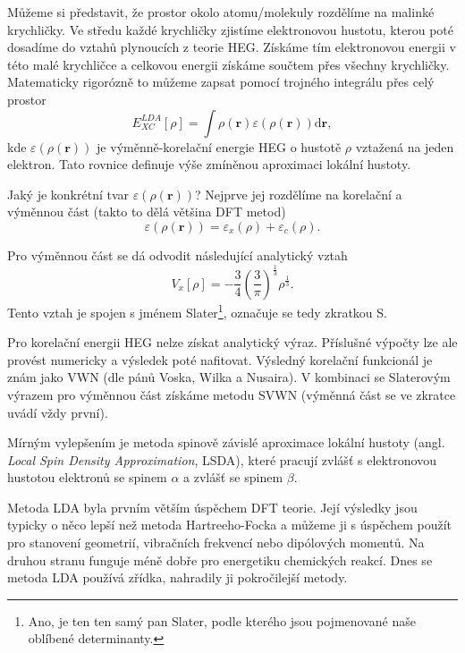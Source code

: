 Můžeme si představit, že prostor okolo atomu/molekuly rozdělíme na malinké krychličky. Ve středu každé krychličky zjistíme elektronovou hustotu, kterou poté dosadíme do vztahů plynoucích z teorie HEG.
Získáme tím elektronovou energii v této malé krychličce a celkovou energii získáme součtem přes všechny krychličky. Matematicky rigorózně to můžeme zapsat pomocí trojného integrálu přes celý prostor
\begin{equation}
E_{XC}^{LDA}[\rho]=\int \rho(\textbf{r}) \varepsilon(\rho(\textbf{r})) \mathrm{d}\textbf{r} ,
\end{equation}
kde $\varepsilon(\rho(\textbf{r}))$ je výměnně-korelační energie HEG o hustotě $\rho$ vztažená na jeden elektron. Tato rovnice definuje výše zmíněnou aproximaci lokální hustoty.

Jaký je konkrétní tvar $\varepsilon(\rho(\textbf{r}))$? Nejprve jej rozdělíme na korelační a výměnnou část (takto to dělá většina DFT metod)
\begin{equation}
\varepsilon(\rho(\textbf{r}))=\varepsilon_x(\rho)+\varepsilon_c(\rho) .
\end{equation}

\noindent Pro výměnnou část se dá odvodit následující analytický vztah
\begin{equation}
V_x[\rho]=-\frac{3}{4}\left(\frac{3}{\pi}\right)^{\frac{1}{3}}\rho^{\frac{1}{3}}.
\end{equation}
Tento vztah je spojen s jménem Slater\footnote{Ano, je ten ten samý pan Slater, podle kterého jsou pojmenované naše oblíbené determinanty.}, označuje se tedy zkratkou S.

Pro korelační energii HEG nelze získat analytický výraz. Příslušné výpočty lze ale provést numericky a výsledek poté nafitovat. Výsledný korelační funkcionál je znám jako VWN (dle pánů Voska, Wilka a Nusaira). V kombinaci se Slaterovým výrazem pro výměnnou část získáme metodu SVWN (výměnná část se ve zkratce uvádí vždy první).

Mírným vylepšením je metoda spinově závislé aproximace lokální hustoty (angl. \textit{Local Spin Density Approximation}, LSDA), které pracují zvlášť s elektronovou hustotou elektronů se spinem $\alpha$ a zvlášť se spinem $\beta$.

Metoda LDA byla prvním větším úspěchem DFT teorie. Její výsledky jsou typicky o něco lepší než metoda Hartreeho-Focka a můžeme ji s úspěchem použít pro stanovení geometrií, vibračních frekvencí nebo dipólových momentů. Na druhou stranu funguje méně dobře pro energetiku chemických reakcí. Dnes se metoda LDA používá zřídka, nahradily ji pokročilejší metody.

